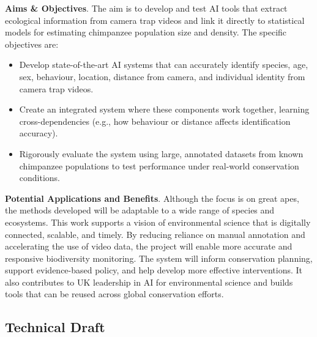 \textbf{Aims \& Objectives}. The aim is to develop and test AI tools that extract ecological information from camera trap videos and link it directly to statistical models for estimating chimpanzee population size and density. The specific objectives are:

\begin{itemize}
    \item Develop state-of-the-art AI systems that can accurately identify species, age, sex, behaviour, location, distance from camera, and individual identity from camera trap videos.
    \item Create an integrated system where these components work together, learning cross-dependencies (e.g., how behaviour or distance affects identification accuracy).
    \item Rigorously evaluate the system using large, annotated datasets from known chimpanzee populations to test performance under real-world conservation conditions.
\end{itemize}

\textbf{Potential Applications and Benefits}. Although the focus is on great apes, the methods developed will be adaptable to a wide range of species and ecosystems. This work supports a vision of environmental science that is digitally connected, scalable, and timely. By reducing reliance on manual annotation and accelerating the use of video data, the project will enable more accurate and responsive biodiversity monitoring. The system will inform conservation planning, support evidence-based policy, and help develop more effective interventions. It also contributes to UK leadership in AI for environmental science and builds tools that can be reused across global conservation efforts. 

\subsection*{Technical Draft}

